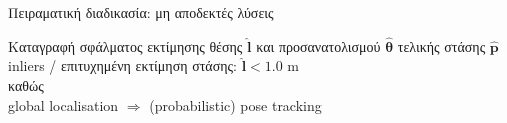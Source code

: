 \begin{frame}{Πειραματική διαδικασία: μη αποδεκτές λύσεις}

  Καταγραφή σφάλματος εκτίμησης θέσης $\hat{\bm{l}}$ και
  προσανατολισμού $\hat{\bm{\theta}}$ τελικής στάσης $\hat{\bm{p}}$ \\

  inliers / επιτυχημένη εκτίμηση στάσης: $\hat{\bm{l}} < 1.0$ m \\

  καθώς \\

  global localisation $\Rightarrow$ (probabilistic) pose tracking


\end{frame}
